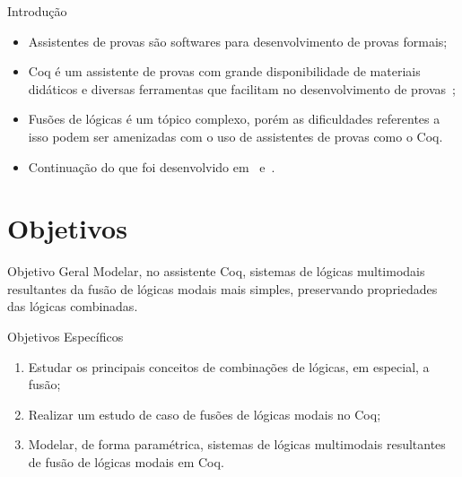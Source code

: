 \documentclass[xcolor=table]{beamer}
\begin{document}
    \begin{frame}{Introdução}
        \begin{itemize}
            \item Assistentes de provas são softwares para desenvolvimento de provas formais;
            \item Coq é um assistente de provas com grande disponibilidade de materiais didáticos e diversas ferramentas que facilitam no desenvolvimento de provas~\cite{silva2019certificacao};
            \item Fusões de lógicas é um tópico complexo, porém as dificuldades referentes a isso podem ser amenizadas com o uso de assistentes de provas como o Coq.
            \item Continuação do que foi desenvolvido em~\cite{silveira2020implementacao} e~\cite{silveira2022sound}.
        \end{itemize}
    \end{frame}

    \section[]{Objetivos}
    \begin{frame}{Objetivo Geral}
        Modelar, no assistente Coq, sistemas de lógicas multimodais resultantes da fusão de lógicas modais mais simples,
		preservando propriedades das lógicas combinadas.
    \end{frame}

    \begin{frame}{Objetivos Específicos}
        \begin{enumerate}
			\item Estudar os principais conceitos de combinações de lógicas, em especial, a fusão;
			\item Realizar um estudo de caso de fusões de lógicas modais no Coq;
			\item Modelar, de forma paramétrica, sistemas de lógicas multimodais resultantes de fusão de lógicas modais em Coq.
		\end{enumerate}
    \end{frame}
\end{document}
